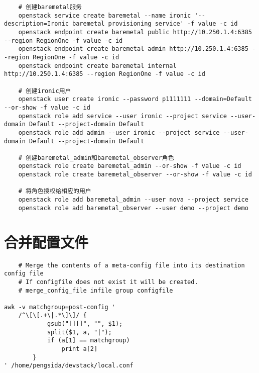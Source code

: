 \documentclass[a4paper,left=1.5cm,right=1.5cm,11pt]{article}
\begin{document}
\begin{lstlisting}
	# 创建baremetal服务
    openstack service create baremetal --name ironic '--description=Ironic baremetal provisioning service' -f value -c id
	openstack endpoint create baremetal public http://10.250.1.4:6385 --region RegionOne -f value -c id
	openstack endpoint create baremetal admin http://10.250.1.4:6385 --region RegionOne -f value -c id
	openstack endpoint create baremetal internal http://10.250.1.4:6385 --region RegionOne -f value -c id
	
	# 创建ironic用户
	openstack user create ironic --password p1111111 --domain=Default --or-show -f value -c id
	openstack role add service --user ironic --project service --user-domain Default --project-domain Default
	openstack role add admin --user ironic --project service --user-domain Default --project-domain Default

	# 创建baremetal_admin和baremetal_observer角色
	openstack role create baremetal_admin --or-show -f value -c id
	openstack role create baremetal_observer --or-show -f value -c id

	# 将角色授权给相应的用户
	openstack role add baremetal_admin --user nova --project service
	openstack role add baremetal_observer --user demo --project demo
	\end{lstlisting}

\section{合并配置文件}
	\begin{lstlisting}
	# Merge the contents of a meta-config file into its destination config file
	# If configfile does not exist it will be created.
	# merge_config_file infile group configfile

awk -v matchgroup=post-config '
	/^\[\[.+\|.*\]\]/ {
            gsub("[][]", "", $1);
            split($1, a, "|");
            if (a[1] == matchgroup)
                print a[2]
        }
' /home/pengsida/devstack/local.conf
	\end{lstlisting}
\end{document}
